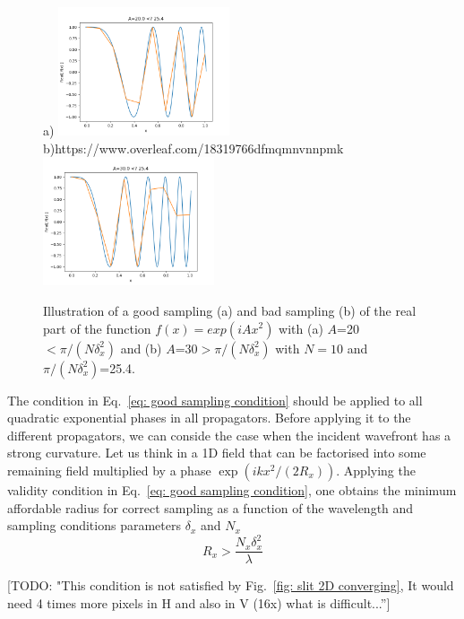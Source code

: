 \documentclass{iucr}              %
\newcommand{\todo}[1]{{\color{red}[TODO: "#1'']}}
\begin{document}
\begin{figure}
\label{fig: phase sampling}
\caption{Illustration of a good sampling (a) and bad sampling (b) of the real part of the function $f(x)=exp(i A x^2)$ with (a) $A$=20$< \pi / (N \delta_x^2)$ and (b) $A$=30$ > \pi / (N \delta_x^2)$ with $N=10$ and $\pi / (N \delta_x^2)$=25.4. 
}
a)
\includegraphics[width=0.45\textwidth]{sample_quadratic_phase_A20.png}
b)https://www.overleaf.com/18319766dfmqmnvnnpmk
\includegraphics[width=0.45\textwidth]{sample_quadratic_phase_A30.png}
\end{figure}

The condition in Eq.~\ref{eq: good sampling condition} should be applied to all quadratic exponential phases in all propagators. Before applying it to the different propagators, we can conside the case when the incident wavefront has a strong curvature. Let us think in a 1D
field that can be factorised into some remaining field multiplied by a phase $\exp(i k x^2 /  (2 R_x))$. Applying the validity condition in Eq.~\ref{eq: good sampling condition}, one obtains the minimum affordable radius for correct sampling as a function of the wavelength and sampling conditions parameters $\delta_x$ and $N_x$
\begin{equation}
    R_x > \frac{N_x \delta_x^2}{\lambda}
\end{equation}

\todo{This condition is not satisfied by Fig.~\ref{fig: slit 2D converging}, It would need 4 times more pixels in H and also in V (16x) what is difficult...}
\end{document}

